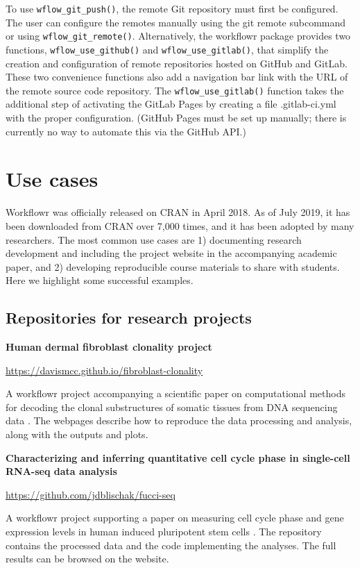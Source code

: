 \documentclass[9pt,a4paper]{extarticle}
\begin{document}
To use \texttt{wflow\_git\_push()}, the remote Git repository must first be
configured. The user can configure the remotes manually using the git
remote subcommand or using \texttt{wflow\_git\_remote()}. Alternatively, the
workflowr package provides two functions, \texttt{wflow\_use\_github()} and
\texttt{wflow\_use\_gitlab()}, that simplify the creation and configuration of
remote repositories hosted on GitHub and GitLab. These two convenience
functions also add a navigation bar link with the URL of the remote
source code repository. The \texttt{wflow\_use\_gitlab()} function takes the
additional step of activating the GitLab Pages by creating a file
.gitlab-ci.yml with the proper configuration. (GitHub Pages must be set
up manually; there is currently no way to automate this via the GitHub
API.)


\section*{Use cases}

Workflowr was officially released on CRAN in April 2018. As of July
2019, it has been downloaded from CRAN over 7,000 times, and it has been
adopted by many researchers. The most common use cases are 1)
documenting research development and including the project website in
the accompanying academic paper, and 2) developing reproducible course
materials to share with students. Here we highlight some successful
examples.

\subsection*{Repositories for research projects}

\textbf{Human dermal fibroblast clonality project}

\url{https://davismcc.github.io/fibroblast-clonality}

A workflowr project accompanying a scientific paper on computational
methods for decoding the clonal substructures of somatic tissues from
DNA sequencing data \cite{McCarthy2018}. The webpages describe how to
reproduce the data processing and analysis, along with the outputs and
plots.

\textbf{Characterizing and inferring quantitative cell cycle phase in
single-cell RNA-seq data analysis}

\url{https://github.com/jdblischak/fucci-seq}

A workflowr project supporting a paper on measuring cell cycle phase and
gene expression levels in human induced pluripotent stem cells
\cite{Hsiao2019}. The repository contains the processed data and the
code implementing the analyses. The full results can be browsed on the
website.
\end{document}
